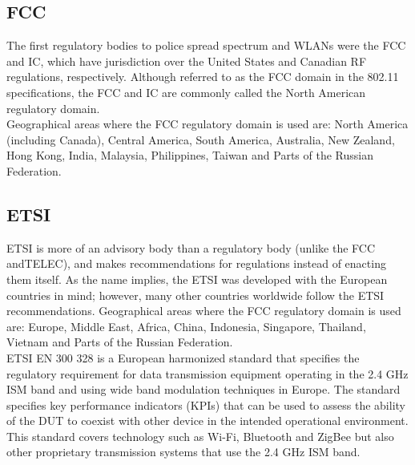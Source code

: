\subsection{\acf{FCC}}
The first regulatory bodies to police spread spectrum and \acsp{WLAN} were the \acf{FCC} and  \acf{IC}, which have jurisdiction over the United States and Canadian \acs{RF} regulations, respectively. Although referred to as the \acs{FCC} domain in the 802.11 specifications, the \acs{FCC} and \acs{IC} are commonly called the North American regulatory domain. \\

Geographical areas where the \acs{FCC} regulatory domain is used are: North America (including Canada), Central America, South America, Australia, New Zealand, Hong Kong, India, Malaysia, Philippines, Taiwan and Parts of the Russian Federation.

\subsection{\acf{ETSI}}
\acs{ETSI} is more of an advisory body than a regulatory body (unlike the \acs{FCC} and\acs{TELEC}), and makes recommendations for regulations instead of enacting them itself. As the name implies, the \acs{ETSI} was developed with the European countries in mind; however, many other countries worldwide follow the \acs{ETSI} recommendations. Geographical areas where the \acs{FCC} regulatory domain is used are: Europe, Middle East, Africa, China, Indonesia, Singapore, Thailand, Vietnam and Parts of the Russian Federation. \\

\acs{ETSI} EN 300 328 is a European harmonized standard that specifies the regulatory requirement for data transmission equipment operating in the 2.4 GHz \acs{ISM} band and using wide band modulation techniques in Europe. The standard specifies key performance indicators (KPIs) that can be used to assess the ability of the \acs{DUT} to coexist with other device in the intended operational environment. This standard covers technology such as Wi-Fi\texttrademark{}, Bluetooth\textregistered{} and ZigBee but also other proprietary transmission systems that use the 2.4 GHz \acs{ISM} band.  \\

